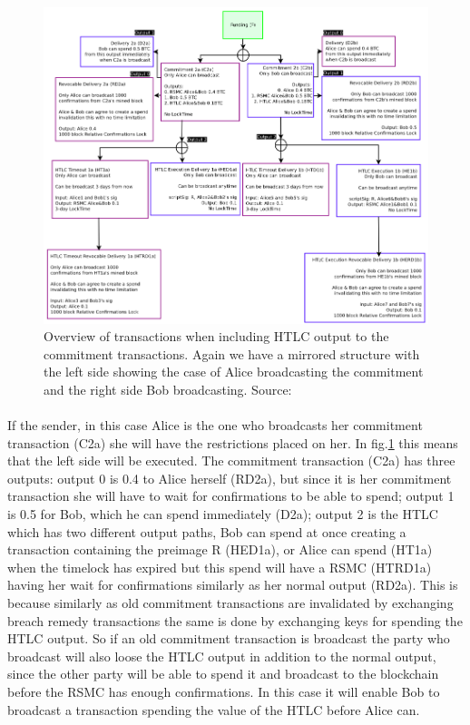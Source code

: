 \begin{figure}[h]
    \centering
    \includegraphics[width=14cm]{figures/ln_htlc.png}
    \caption{ Overview of transactions when including HTLC output to the commitment transactions. Again we have a mirrored structure with the left side showing the case of Alice broadcasting the commitment and the right side Bob broadcasting.  Source: \cite{poon2015bitcoin}}
    \label{fig:htlc_commit}
\end{figure}


\paragraph{}
If the sender, in this case Alice is the one who broadcasts her commitment transaction (C2a) she will have the restrictions placed on her.
In fig.\ref{fig:htlc_commit} this means that the left side will be executed. The commitment transaction (C2a) has three outputs: output 0 is 0.4 to Alice herself (RD2a), but since it is her commitment transaction she will have to wait for confirmations to be able to spend; output 1 is 0.5 for Bob, which he can spend immediately (D2a); output 2 is the HTLC which has two different output paths, Bob can spend at once creating a transaction containing the preimage R (HED1a), or Alice can spend (HT1a) when the timelock has expired but this spend will have a RSMC (HTRD1a) having her wait for confirmations similarly as her normal output (RD2a). This is because similarly as old commitment transactions are invalidated by exchanging breach remedy transactions the same is done by exchanging keys for spending the HTLC output. So if an old commitment transaction is broadcast the party who broadcast will also loose the HTLC output in addition to the normal output, since the other party will be able to spend it and broadcast to the blockchain before the RSMC has enough confirmations. In this case it will enable Bob to broadcast a transaction spending the value of the HTLC before Alice can.

